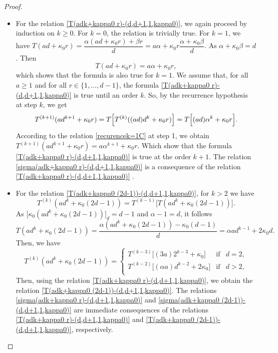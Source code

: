 \documentclass[11pt,a4paper]{article}
\begin{document}
\begin{proof}
	\begin{itemize}
		\item For the relation  \eqref{T(adk+kappa0 r)-(d,d+1,1,kappa0)}, we again proceed by induction on $k\geq 0$. For $k=0$, the relation is trivially true. For $k=1$, we have 
		$T(ad+\kappa_0 r)=\dfrac{\alpha(ad+\kappa_0 r )+\beta r}{d}=a \alpha +\kappa_0 r  \dfrac{\alpha +\kappa_0\beta }{d}$.
		As  $\alpha +\kappa_0 \beta= d$. Then
		\begin{equation}\label{recurencek=1C} 
			T(ad+\kappa_0  r)=a \alpha +\kappa_0r, 
		\end{equation}	
		which shows that the formula is also true for $k=1$. We assume that, for all $a\geq 1$  and for all $r\in\{1,\ldots,d-1\}$,
		the formula \eqref{T(adk+kappa0 r)-(d,d+1,1,kappa0)} is true until an order $k$.   So,  by  the recurrence hypothesis at step $k$, we get
		$$T^{(k+1)}(ad^{k+1}+\kappa_0 r)=T\Bigl[T^{(k)}((ad)d^{k}+\kappa_0 r )\Bigr]=T\Bigl[(ad)\alpha^{k}+\kappa_0r\Bigr].$$
		According to the relation \eqref{recurencek=1C} at step 1, we obtain
		$T^{(k+1)}(ad^{k+1}+\kappa_0 r)=a\alpha^{k+1}+\kappa_0r$.
		Which show that the formula  \eqref{T(adk+kappa0 r)-(d,d+1,1,kappa0)}  is true at the order $k+1$. The relation \eqref{sigma(adk+kappa0 r)-(d,d+1,1,kappa0)} is a consequence of the relation  \eqref{T(adk+kappa0 r)-(d,d+1,1,kappa0)} .
		
		\item For the relation  \eqref{T(adk+kappa0 (2d-1))-(d,d+1,1,kappa0)}, for $k> 2$ we have
		$$T^{(k)}(ad^k+\kappa_0 (2d-1))=T^{(k-1)}\bigl[T(ad^k+\kappa_0 (2d-1))\bigr].$$
		As  $\bigl[\kappa_0(ad^k+\kappa_0 (2d-1))\bigr]_d=d-1$ and $\alpha-1=d$, it follows 
		$$T(ad^k+\kappa_0 (2d-1))=\dfrac{\alpha(ad^k+\kappa_0 (2d-1))-\kappa_0(d-1)}{d}=\alpha ad^{k-1}+2\kappa_0d.$$
		Then,  we have
		\begin{equation}\label{R-3}
			T^{(k)}(ad^k+\kappa_0 (2d-1))=\left\{\begin{array}{lll}
				T^{(k-3)}\bigl[(3 a)2^{k-3}+\kappa_0\bigr] &\mathrm{if}& d=2,\\
				T^{(k-2)}\bigl[(\alpha a)d^{k-2}+2\kappa_0\bigr] &\mathrm{if}& d>2,\\
			\end{array}\right.
		\end{equation} 
		Then, using the relation    \eqref{T(adk+kappa0 r)-(d,d+1,1,kappa0)}, we obtain the relation \eqref{T(adk+kappa0 (2d-1))-(d,d+1,1,kappa0)}.
		The relations \eqref{sigma(adk+kappa0 r)-(d,d+1,1,kappa0)}
		and  \eqref{sigma(adk+kappa0 (2d-1))-(d,d+1,1,kappa0)}
		are  immediate consequences of the relations 
		\eqref{T(adk+kappa0 r)-(d,d+1,1,kappa0)} and
		\eqref{T(adk+kappa0 (2d-1))-(d,d+1,1,kappa0)}, respectively.
	\end{itemize}
	\hfill\end{proof}
\end{document}
